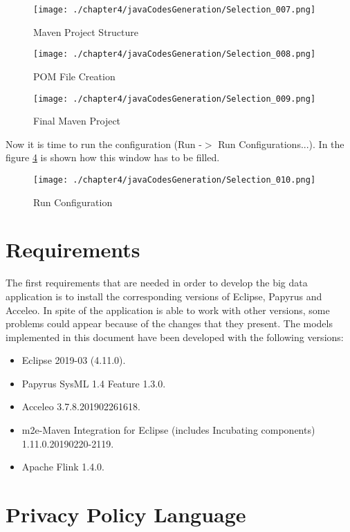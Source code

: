 \begin{figure}
\centering
{\texttt{[image: ./chapter4/javaCodesGeneration/Selection\_007.png]}}
\caption{Maven Project Structure}
\label{fig:Maven Project Structure}
\end{figure}

\begin{figure}
\centering
{\texttt{[image: ./chapter4/javaCodesGeneration/Selection\_008.png]}}
\caption{POM File Creation}
\label{fig:POM File Creation}
\end{figure}

\begin{figure}
\centering
{\texttt{[image: ./chapter4/javaCodesGeneration/Selection\_009.png]}}
\caption{Final Maven Project}
\label{fig:Final Maven Project}
\end{figure}

Now it is time to run the configuration (Run -$>$ Run Configurations...). In the figure \ref{fig:Run Configuration} is shown how this window has to be filled.

\begin{figure}
\centering
{\texttt{[image: ./chapter4/javaCodesGeneration/Selection\_010.png]}}
\caption{Run Configuration}
\label{fig:Run Configuration}
\end{figure}

\section{Requirements}
The first requirements that are needed in order to develop the big data application is to install the corresponding versions of Eclipse, Papyrus and Acceleo. In spite of the application is able to work with other versions, some problems could appear because of the changes that they present. The models implemented in this document have been developed with the following versions:

\begin{itemize}
\item Eclipse 2019-03 (4.11.0).
\item Papyrus SysML 1.4 Feature	1.3.0.
\item Acceleo 3.7.8.201902261618.
\item m2e-Maven Integration for Eclipse (includes Incubating components) 1.11.0.20190220-2119.
\item Apache Flink 1.4.0.
\end{itemize}

\section{Privacy Policy Language}

